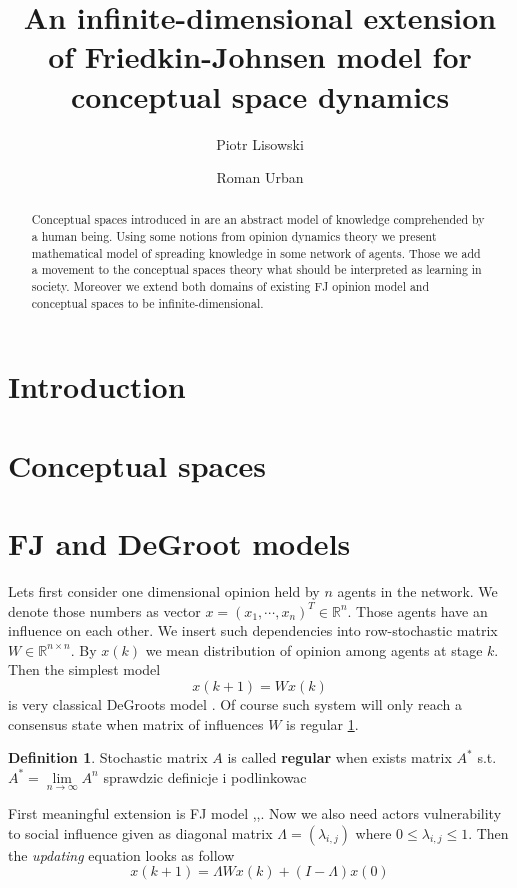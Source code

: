 \documentclass[leqno,12pt]{amsart}
\title[Conceptual spaces dynamics]{An infinite-dimensional extension of Friedkin-Johnsen model  for conceptual space dynamics}
\author[P. Lisowski]{Piotr Lisowski}
\author[R. Urban]{Roman Urban}
\theoremstyle{remark}
\theoremstyle{remark}
\theoremstyle{remark}
\theoremstyle{definition}
\newtheorem{definition}[theorem]{Definition}
\numberwithin{equation}{section}
\newcommand{\R}{\ensuremath{\mathbb{R}}}
\begin{document}
%
%
%
%
%
%
\begin{abstract}
    Conceptual spaces introduced in \cite{} are an abstract model of knowledge comprehended by a human being. Using some notions from opinion dynamics theory we present mathematical model of spreading knowledge in some network of agents. Those we add a movement to the conceptual spaces theory what should be interpreted as learning in society. Moreover we extend both domains of existing FJ opinion model and conceptual spaces to be infinite-dimensional.
\end{abstract}
\maketitle
\section{Introduction}
\section{Conceptual spaces}
%
%
\section{FJ and DeGroot models}
Lets first consider one dimensional opinion held by $n$ agents in the network. We denote those numbers as vector $x = (x_1, \cdots , x_n)^T \in \R^n$. Those agents have an influence on each other. We insert such dependencies into row-stochastic matrix $W\in \R^{n\times n}$. By $x(k)$ we mean distribution of opinion among agents at stage $k$. Then the simplest model
\begin{equation}\label{eq:degroot}
    x(k+1) = Wx(k)
\end{equation}
is very classical DeGroots model \cite{bib:degroot}. Of course such system will only reach a consensus state when matrix of influences $W$ is regular \ref{def:regular}.
\begin{definition}\label{def:regular}
    Stochastic matrix $A$ is called \textbf{regular} when exists matrix $A^*$ s.t. $A^*=\lim\limits_{n\to \infty}A^n$ {\color{red}sprawdzic definicje i podlinkowac}
\end{definition}
First meaningful extension is FJ model \cite{bib:fj1},\cite{bib:fj2},\cite{bib:fj3}.
Now we also need actors vulnerability to social influence given as diagonal matrix $\Lambda=(\lambda_{i,j})$ where $0\leqslant \lambda_{i,j} \leqslant 1$. Then the \textit{updating} equation looks as follow
\begin{equation}\label{eq:fj}
    x(k+1)=\Lambda Wx(k)+(I-\Lambda)x(0)
\end{equation}
\end{document}
